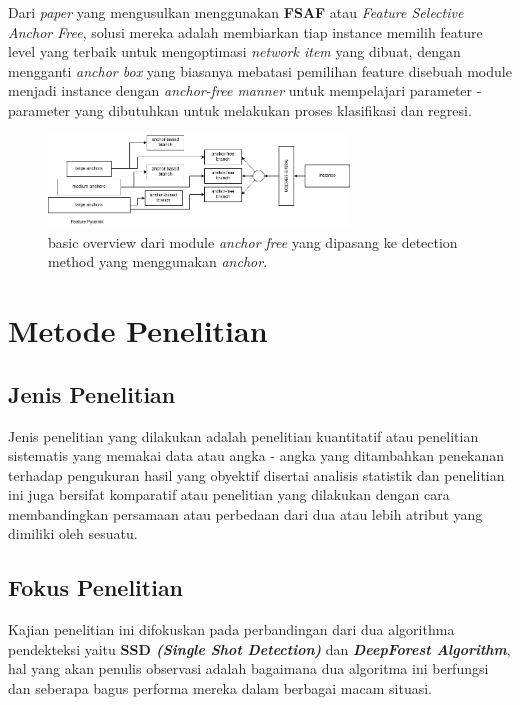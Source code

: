 \documentclass[a4paper]{article}
\begin{document}
\begin{enumerate}
\begin{itemize}
    \end{itemize}


    Dari \textit{paper} yang mengusulkan menggunakan \textbf{FSAF} atau \textit{Feature Selective Anchor Free}, solusi mereka adalah membiarkan tiap instance memilih feature level yang terbaik untuk mengoptimasi \textit{network item} yang dibuat, dengan mengganti \textit{anchor box} yang biasanya mebatasi pemilihan feature disebuah module menjadi instance dengan \textit{anchor-free manner} untuk mempelajari parameter - parameter yang dibutuhkan untuk melakukan proses klasifikasi dan regresi\autocite{Zhu_2019_CVPR}.

    \begin{figure}[h]
        \includegraphics[width=8cm]{basic_overview_FSAF.png}
        \centering
    
        \caption{basic overview dari module \textit{anchor free} yang dipasang ke detection method yang menggunakan \textit{anchor}\autocite{Zhu_2019_CVPR}.}
    \end{figure}
\end{enumerate}

\newpage
\section*{Metode Penelitian}

\subsection*{Jenis Penelitian}
Jenis penelitian yang dilakukan adalah penelitian kuantitatif atau penelitian sistematis yang memakai data atau angka - angka yang ditambahkan penekanan terhadap pengukuran hasil yang obyektif disertai analisis statistik\autocite{pengajar-1} dan penelitian ini juga bersifat komparatif atau penelitian yang dilakukan dengan cara membandingkan persamaan atau perbedaan dari dua atau lebih atribut yang dimiliki oleh sesuatu\autocite{penerbitdeepublish-1}.

\subsection*{Fokus Penelitian}
Kajian penelitian ini difokuskan pada perbandingan dari dua algorithma pendekteksi yaitu \textbf{SSD \textit{(Single Shot Detection)}} dan \textbf{\textit{DeepForest Algorithm}}, hal yang akan penulis observasi adalah bagaimana dua algoritma ini berfungsi dan seberapa bagus performa mereka dalam berbagai macam situasi.
\end{document}
